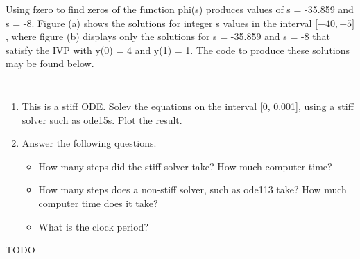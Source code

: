 \documentclass{jhwhw}
\begin{document}
    Using fzero to find zeros of the function phi(s) produces 
    values of s = -35.859 and s = -8.
    Figure (a) shows the solutions for integer s values in the interval
    $\lbrack -40, -5\rbrack$, where figure (b) displays only the solutions
    for s = -35.859 and s = -8 that satisfy the IVP with y(0) = 4 and y(1) = 1.
    The code to produce these solutions may be found below.

    \clearpage
    \inputminted[linenos,frame=lines,framesep=2mm]{octave}{p4.m}
    \inputminted[linenos,frame=lines,framesep=2mm]{octave}{phi.m}

\problem{}

    \begin{enumerate}
	\item This is a stiff ODE. Solev the equations on the interval [0, 0.001],
	    using a stiff solver such as ode15s. Plot the result.
	\item Answer the following questions.
	    \begin{itemize}
		\item How many steps did the stiff solver take? How much computer time?
		\item How many steps does a non-stiff solver, such as ode113 take? How
		    much computer time does it take?
		\item What is the clock period?
	    \end{itemize}
    \end{enumerate}

\solution

    TODO
\end{document}
